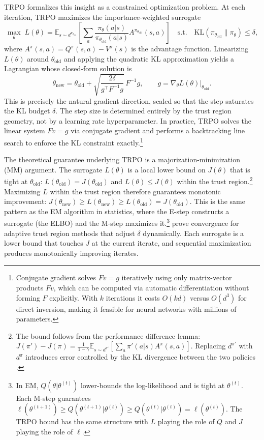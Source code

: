 TRPO formalizes this insight as a constrained optimization problem. At each iteration, TRPO maximizes the importance-weighted surrogate
\begin{equation}
\label{eq:trpo}
\max_\theta \; L(\theta) = \mathbb{E}_{s \sim d^{\pi_{\theta_{\mathrm{old}}}}} \left[ \sum_a \frac{\pi_\theta(a|s)}{\pi_{\theta_{\mathrm{old}}}(a|s)} A^{\pi_{\theta_{\mathrm{old}}}}(s,a) \right] \quad \text{s.t.} \quad \mathrm{KL}(\pi_{\theta_{\mathrm{old}}} \| \pi_\theta) \leq \delta,
\end{equation}
where $A^{\pi}(s,a) = Q^{\pi}(s,a) - V^{\pi}(s)$ is the advantage function. Linearizing $L(\theta)$ around $\theta_{\mathrm{old}}$ and applying the quadratic KL approximation yields a Lagrangian whose closed-form solution is
\begin{equation}
\label{eq:trpo_step}
\theta_{\mathrm{new}} = \theta_{\mathrm{old}} + \sqrt{\frac{2\delta}{g^\top F^{-1} g}} \, F^{-1} g, \qquad g = \nabla_\theta L(\theta)\big|_{\theta_{\mathrm{old}}}.
\end{equation}
This is precisely the natural gradient direction, scaled so that the step saturates the KL budget $\delta$. The step size is determined entirely by the trust region geometry, not by a learning rate hyperparameter. In practice, TRPO solves the linear system $F v = g$ via conjugate gradient and performs a backtracking line search to enforce the KL constraint exactly.\footnote{Conjugate gradient solves $Fv = g$ iteratively using only matrix-vector products $Fv$, which can be computed via automatic differentiation without forming $F$ explicitly. With $k$ iterations it costs $O(kd)$ versus $O(d^3)$ for direct inversion, making it feasible for neural networks with millions of parameters.}

The theoretical guarantee underlying TRPO is a majorization-minimization (MM) argument. The surrogate $L(\theta)$ is a local lower bound on $J(\theta)$ that is tight at $\theta_{\mathrm{old}}$: $L(\theta_{\mathrm{old}}) = J(\theta_{\mathrm{old}})$ and $L(\theta) \leq J(\theta)$ within the trust region.\footnote{The bound follows from the performance difference lemma: $J(\pi') - J(\pi) = \frac{1}{1-\gamma} \mathbb{E}_{s \sim d^{\pi'}}[\sum_a \pi'(a|s) A^\pi(s,a)]$. Replacing $d^{\pi'}$ with $d^{\pi}$ introduces error controlled by the KL divergence between the two policies \citep{Kakade2002}.} Maximizing $L$ within the trust region therefore guarantees monotonic improvement: $J(\theta_{\mathrm{new}}) \geq L(\theta_{\mathrm{new}}) \geq L(\theta_{\mathrm{old}}) = J(\theta_{\mathrm{old}})$. This is the same pattern as the EM algorithm in statistics, where the E-step constructs a surrogate (the ELBO) and the M-step maximizes it.\footnote{In EM, $Q(\theta|\theta^{(t)})$ lower-bounds the log-likelihood and is tight at $\theta^{(t)}$. Each M-step guarantees $\ell(\theta^{(t+1)}) \geq Q(\theta^{(t+1)}|\theta^{(t)}) \geq Q(\theta^{(t)}|\theta^{(t)}) = \ell(\theta^{(t)})$. The TRPO bound has the same structure with $L$ playing the role of $Q$ and $J$ playing the role of $\ell$.} \citet{shani2020} prove convergence for adaptive trust region methods that adjust $\delta$ dynamically. Each surrogate is a lower bound that touches $J$ at the current iterate, and sequential maximization produces monotonically improving iterates.



